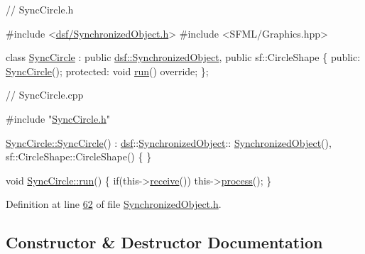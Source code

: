 \begin{DoxyCode}
\textcolor{comment}{// SyncCircle.h}

\textcolor{preprocessor}{#include <\hyperlink{_synchronized_object_8h}{dsf/SynchronizedObject.h}>}
\textcolor{preprocessor}{#include <SFML/Graphics.hpp>}

\textcolor{keyword}{class }\hyperlink{class_sync_circle}{SyncCircle} : \textcolor{keyword}{public} \hyperlink{classdsf_1_1_synchronized_object}{dsf::SynchronizedObject}, \textcolor{keyword}{public} sf::CircleShape
\{
\textcolor{keyword}{public}:
   \hyperlink{class_sync_circle}{SyncCircle}();
\textcolor{keyword}{protected}:
   \textcolor{keywordtype}{void} \hyperlink{classdsf_1_1_synchronized_object_ae94875bd63d8071f8a563ac45ca7ccc2}{run}() \textcolor{keyword}{override};
\};


\textcolor{comment}{// SyncCircle.cpp}

\textcolor{preprocessor}{#include "\hyperlink{_sync_circle_8h}{SyncCircle.h}"}

\hyperlink{class_sync_circle_ac4137a95bfb88c1014059c57ceb92d2c}{SyncCircle::SyncCircle}()  : \hyperlink{namespacedsf}{dsf}::\hyperlink{classdsf_1_1_synchronized_object_a3f1d2def677e6d814de4d0bd2aa3d95b}{SynchronizedObject}::
      \hyperlink{classdsf_1_1_synchronized_object_a3f1d2def677e6d814de4d0bd2aa3d95b}{SynchronizedObject}(), sf::CircleShape::CircleShape()
\{
\}

\textcolor{keywordtype}{void} \hyperlink{class_sync_circle_aa3087260d193fe4fee75b2adcfb986a3}{SyncCircle::run}()
\{
   \textcolor{keywordflow}{if}(this->\hyperlink{classdsf_1_1_synchronized_object_a3ce496c6aaecc4b0ca3a4d09539a4920}{receive}())
       this->\hyperlink{classdsf_1_1_task_box_ad35070ac305146aaa4073b2078d9209e}{process}();
\}
\end{DoxyCode}
 

Definition at line \hyperlink{_synchronized_object_8h_source_l00062}{62} of file \hyperlink{_synchronized_object_8h_source}{Synchronized\+Object.\+h}.



\subsection{Constructor \& Destructor Documentation}
\hypertarget{classdsf_1_1_synchronized_object_a3f1d2def677e6d814de4d0bd2aa3d95b}{}
